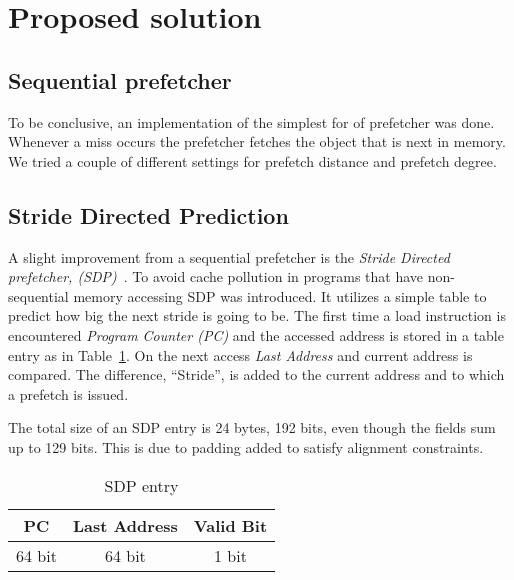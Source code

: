 \section{Proposed solution}


\subsection{Sequential prefetcher}
To be conclusive, an implementation of the simplest for of prefetcher
was done. Whenever a miss occurs the prefetcher fetches the object
that is next in memory. We tried a couple of different settings for
prefetch distance and prefetch degree.

\subsection{Stride Directed Prediction}
A slight improvement from a sequential prefetcher is the
\textit{Stride Directed prefetcher, (SDP)}~\cite{sdp}.
To avoid cache pollution in programs that have non-sequential memory
accessing SDP was introduced. It utilizes a simple table to
predict how big the next stride is going to be. The first time a load
instruction is encountered \textit{Program Counter (PC)} and the
accessed address is stored in a table entry as in
Table~\ref{table:sdpentry}. On the next access \textit{Last Address}
and current address is compared. The difference, ``Stride'', is added
to the current address and to which a prefetch is issued.

The total size of an SDP entry is 24 bytes, 192 bits, even though the
fields sum up to 129 bits. This is due to padding added to satisfy
alignment constraints.

\begin{table}[h]
  \centering
  \begin{tabular}{ | c | c | c |}
    \hline
    PC & Last Address & Valid Bit \\ \hline
    64 bit & 64 bit & 1 bit \\ \hline
  \end{tabular}
  \caption{SDP entry}
  \label{table:sdpentry}
\end{table}



